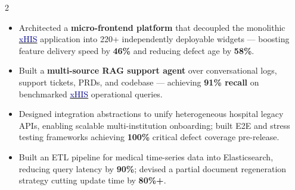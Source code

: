 \documentclass[10pt,a4paper,ragged2e,withhyper]{altacv}
\begin{document}
\begin{paracol}{2}
\begin{itemize}
  \item Architected a \textbf{micro-frontend platform} that decoupled the monolithic \href{https://aics.asus.com/xhis-en/}{\textcolor{DarkBlue}{xHIS}} application into 220+ independently deployable widgets — boosting feature delivery speed by \textbf{46\%} and reducing defect age by \textbf{58\%}.

  \item Built a \textbf{multi-source RAG support agent} over conversational logs, support tickets, PRDs, and codebase — achieving \textbf{91\% recall} on benchmarked \href{https://aics.asus.com/xhis-en/}{\textcolor{DarkBlue}{xHIS}} operational queries.

\end{itemize}

\divider

\begin{itemize}
    \item Designed integration abstractions to unify heterogeneous hospital legacy APIs, enabling scalable multi-institution onboarding; built E2E and stress testing frameworks achieving \textbf{100\%} critical defect coverage pre-release.
    \item Built an ETL pipeline for medical time-series data into Elasticsearch, reducing query latency by \textbf{90\%}; devised a partial document regeneration strategy cutting update time by \textbf{80\%+}.
\end{itemize}

\medskip
{}

{\LaTeXraggedright
{}
\par}

\divider\smallskip

{\LaTeXraggedright
{}
\par}

\divider\smallskip \\

{\LaTeXraggedright
{}
\par}

\divider\smallskip \\
{\LaTeXraggedright
{}
\par}


\end{paracol}
\end{document}
